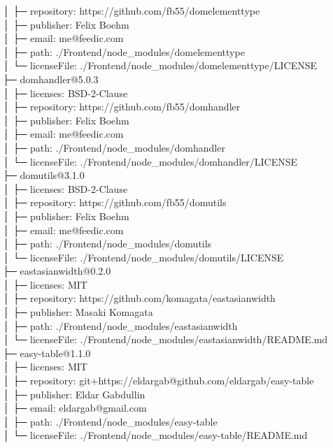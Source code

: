 │  ├─ repository: https://github.com/fb55/domelementtype\\
│  ├─ publisher: Felix Boehm\\
│  ├─ email: me@feedic.com\\
│  ├─ path: ./Frontend/node\_modules/domelementtype\\
│  └─ licenseFile: ./Frontend/node\_modules/domelementtype/LICENSE\\
├─ domhandler@5.0.3\\
│  ├─ licenses: BSD-2-Clause\\
│  ├─ repository: https://github.com/fb55/domhandler\\
│  ├─ publisher: Felix Boehm\\
│  ├─ email: me@feedic.com\\
│  ├─ path: ./Frontend/node\_modules/domhandler\\
│  └─ licenseFile: ./Frontend/node\_modules/domhandler/LICENSE\\
├─ domutils@3.1.0\\
│  ├─ licenses: BSD-2-Clause\\
│  ├─ repository: https://github.com/fb55/domutils\\
│  ├─ publisher: Felix Boehm\\
│  ├─ email: me@feedic.com\\
│  ├─ path: ./Frontend/node\_modules/domutils\\
│  └─ licenseFile: ./Frontend/node\_modules/domutils/LICENSE\\
├─ eastasianwidth@0.2.0\\
│  ├─ licenses: MIT\\
│  ├─ repository: https://github.com/komagata/eastasianwidth\\
│  ├─ publisher: Masaki Komagata\\
│  ├─ path: ./Frontend/node\_modules/eastasianwidth\\
│  └─ licenseFile: ./Frontend/node\_modules/eastasianwidth/README.md\\
├─ easy-table@1.1.0\\
│  ├─ licenses: MIT\\
│  ├─ repository: git+https://eldargab@github.com/eldargab/easy-table\\
│  ├─ publisher: Eldar Gabdullin\\
│  ├─ email: eldargab@gmail.com\\
│  ├─ path: ./Frontend/node\_modules/easy-table\\
│  └─ licenseFile: ./Frontend/node\_modules/easy-table/README.md\\
